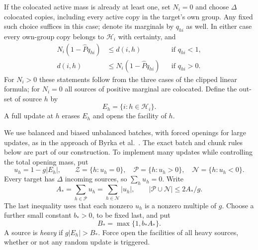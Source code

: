 If the colocated active mass is already at least one, set $N_i=0$ and
choose $\Delta$ colocated copies, including every active copy in the
target's own group.  Any fixed such choice suffices in this case; denote
its marginals by $q_{hi}$ as well.  In either case every own-group copy
belongs to $\mathcal H_i$ with certainty, and
\begin{equation}\label{eq:rnd-taper-comparison}
 \begin{aligned}
  N_i(1-\widehat Pq_{hi})&\le d(i,h)&&\text{if }q_{hi}<1,\\
  d(i,h)&\le N_i(1-\widehat Pq_{hi})&&\text{if }q_{hi}>0.
 \end{aligned}
\end{equation}
For $N_i>0$ these statements follow from the three cases of the clipped
linear formula; for $N_i=0$ all sources of positive marginal are
colocated.  Define the out-set of source $h$ by
\[
 E_h=\{i:h\in\mathcal H_i\}.
\]
A full update at $h$ erases $E_h$ and opens the facility of $h$.

We use balanced and biased unbalanced batches, with forced openings for
large updates, as in the approach of Byrka et
al.~\cite[Algorithms~4--5 and Section~5.4]{ByrkaEtAl2026}.
The exact batch and chunk rules below are part of our construction.
To implement many updates while controlling the total opening mass, put
\[
 u_h=1-g|E_h|,
 \qquad
 \mathcal Z=\{h:u_h=0\},\quad
 \mathcal P=\{h:u_h>0\},\quad
 \mathcal N=\{h:u_h<0\}.
\]
Every target has $\Delta$ incoming sources, so $\sum_hu_h=0$.  Write
\begin{equation}\label{eq:rnd-balance-size}
 A_* =\sum_{h\in\mathcal P}u_h
     =\sum_{h\in\mathcal N}|u_h|,
 \qquad
 |\mathcal P\cup\mathcal N|\le 2A_*/g.
\end{equation}
The last inequality uses that each nonzero $u_h$ is a nonzero multiple
of $g$.  Choose a further small constant $b_*>0$, to be fixed last, and put
\[
 B_* =\max\{1,b_*A_*\}.
\]
A source is \emph{heavy} if $g|E_h|>B_*$.  Force open the facilities of
all heavy sources, whether or not any random update is triggered.

